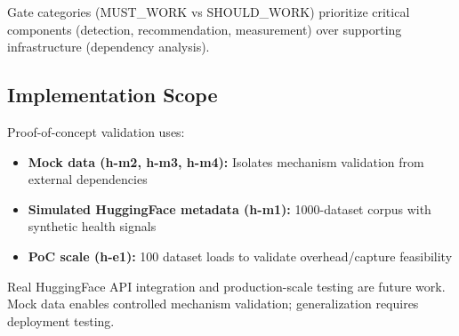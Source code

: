 Gate categories (MUST\_WORK vs SHOULD\_WORK) prioritize critical components (detection, recommendation, measurement) over supporting infrastructure (dependency analysis).

\subsection{Implementation Scope}

Proof-of-concept validation uses:
\begin{itemize}
\item \textbf{Mock data (h-m2, h-m3, h-m4):} Isolates mechanism validation from external dependencies
\item \textbf{Simulated HuggingFace metadata (h-m1):} 1000-dataset corpus with synthetic health signals
\item \textbf{PoC scale (h-e1):} 100 dataset loads to validate overhead/capture feasibility
\end{itemize}

Real HuggingFace API integration and production-scale testing are future work. Mock data enables controlled mechanism validation; generalization requires deployment testing.
